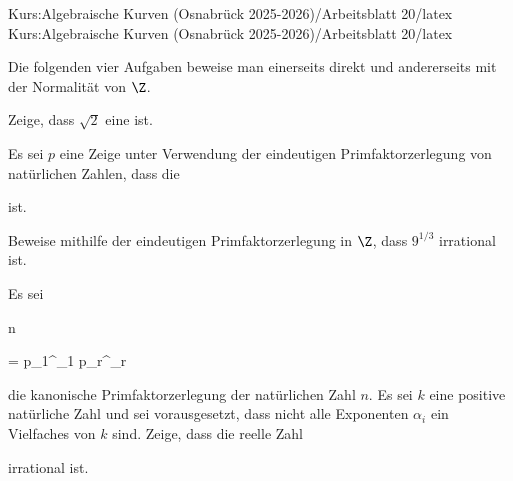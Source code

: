 Kurs:Algebraische Kurven (Osnabrück 2025-2026)/Arbeitsblatt 20/latex
Kurs:Algebraische Kurven (Osnabrück 2025-2026)/Arbeitsblatt 20/latex

\setcounter{section}{20}




Die folgenden vier Aufgaben beweise man einerseits direkt und andererseits mit der Normalität von $\Z$.



{}

{


Zeige, dass $\sqrt{2}$ eine
ist.


}

{} {}



{}

{


Es sei $p$ eine
Zeige unter Verwendung der
eindeutigen Primfaktorzerlegung
von natürlichen Zahlen, dass die


ist.


}

{} {}



{}

{


Beweise mithilfe der eindeutigen Primfaktorzerlegung in $\Z$, dass $9^{1/3}$ irrational ist.


}

{} {}



{}

{


Es sei


\mavergleichskette

{\vergleichskette

{ n
}

{ = }{ p_1^{\alpha_1 } \cdots p_r^{\alpha_r}
}

{  }{
}

{    }{
}

{   }{
}

}
{}{}{}
die kanonische Primfaktorzerlegung der natürlichen Zahl $n$. Es sei $k$ eine positive natürliche Zahl und sei vorausgesetzt, dass nicht alle Exponenten $\alpha_i$ ein Vielfaches von $k$ sind. Zeige, dass
die reelle Zahl


 {  }


irrational ist.


}

